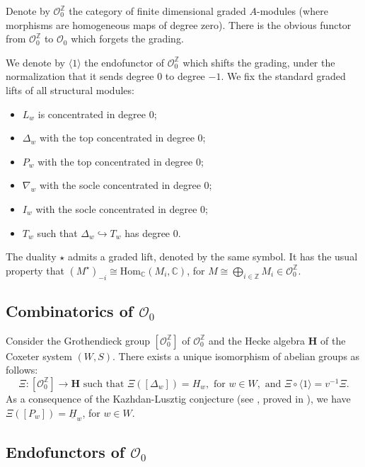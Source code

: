\documentclass[a4paper]{amsart}
\begin{document}
Denote by $\mathcal{O}_0^\mathbb{Z}$ the category of finite dimensional 
graded $A$-modules (where morphisms are homogeneous maps of degree zero).
There is the obvious functor from $\mathcal{O}_0^\mathbb{Z}$ to
$\mathcal{O}_0$ which forgets the grading.

We denote by $\langle 1\rangle$ the endofunctor of $\mathcal{O}_0^\mathbb{Z}$
which shifts the grading, under the normalization that it sends degree 
$0$ to degree $-1$. We fix the standard graded lifts of all structural modules:
\begin{itemize}
\item $L_w$ is concentrated in degree $0$;
\item $\Delta_w$ with the top concentrated in degree $0$;
\item $P_w$ with the top concentrated in degree $0$;
\item $\nabla_w$ with the socle concentrated in degree $0$;
\item $I_w$ with the socle concentrated in degree $0$;
\item $T_w$ such that $\Delta_w\hookrightarrow T_w$ has degree  $0$.
\end{itemize}
The duality $\star$ admits a graded lift, denoted by the same symbol.
It has the usual property that $(M^\star)_{-i}\cong \mathrm{Hom}_\mathbb{C}(M_i,\mathbb{C})$,
for $\displaystyle  M\cong \bigoplus_{i\in\mathbb{Z}}M_i\in \mathcal{O}_0^\mathbb{Z}$.

\subsection{Combinatorics of $\mathcal{O}_0$}\label{s5.3}

Consider the Grothendieck group $[\mathcal{O}_0^\mathbb{Z}]$ of $\mathcal{O}_0^\mathbb{Z}$
and the Hecke algebra $\mathbf{H}$ of the Coxeter system $(W,S)$.
There exists a unique isomorphism of abelian groups as follows:
\begin{displaymath}
\Xi:[\mathcal{O}_0^\mathbb{Z}]\to \mathbf{H}
\text{ such that }\Xi([\Delta_w])=H_w, \text{ for } w\in W, 
\text{ and }\Xi\circ \langle 1\rangle=v^{-1}\Xi.
\end{displaymath}
As a consequence  of the Kazhdan-Lusztig conjecture
(see \cite{KL}, proved in \cite{BB,BK}), we have 
$\Xi([P_w])=\underline{H}_w$,  for $w\in W$.

\subsection{Endofunctors of $\mathcal{O}_0$}\label{s5.4}
\end{document}
